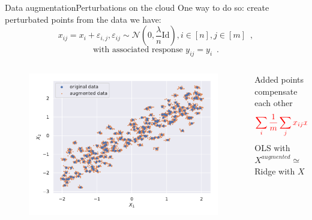 \documentclass[10pt,aspectratio=43]{beamer}
\begin{document}
\begin{frame}{Data augmentation}{Perturbations on the cloud}
    One way to do so: create perturbated points from the data we have:
    \[x_{ij}=x_i + \varepsilon_{i,j}, \varepsilon_{ij}\sim\mathcal{N}\left(0, \frac{\lambda}{n}\mathrm{Id}\right), i\in[n], j\in[m]\enspace,\]
    \[\text{with associated response }y_{ij}=y_i\enspace .\]
    \vspace{-.5cm}
    \begin{columns}
        \begin{column}{.6\paperwidth}
            \begin{figure}
                \centering
                \includegraphics[scale=.35]{data_augmentation.pdf}
            \end{figure}
        \end{column}
        \begin{column}{.4\paperwidth}
            Added points compensate each other $$ \textcolor{red}{\sum_i\frac{1}{m}\sum_jx_{ij}x_{ij}^\top \simeq (XX^\top + \lambda \mathrm{Id})}$$
            OLS with $X^{augmented} \simeq$ Ridge with $X$
        \end{column}
    \end{columns}
\end{frame}

\end{document}

